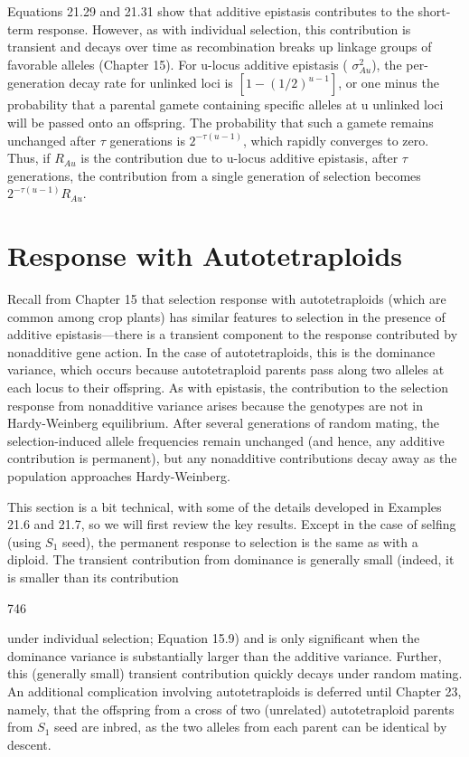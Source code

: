 \documentclass{article}
\begin{document}
Equations 21.29 and 21.31 show that additive epistasis contributes to the short-term response. However, as with individual selection, this contribution is transient and decays over time as recombination breaks up linkage groups of favorable alleles (Chapter 15). For u-locus additive epistasis ( $ \sigma_{Au}^2 $), the per-generation decay rate for unlinked loci is  $ [1 - (1/2)^{u-1}] $, or one minus the probability that a parental gamete containing specific alleles at u unlinked loci will be passed onto an offspring. The probability that such a gamete remains unchanged after  $ \tau $ generations is  $ 2^{-\tau(u-1)} $, which rapidly converges to zero. Thus, if  $ R_{Au} $ is the contribution due to u-locus additive epistasis, after  $ \tau $ generations, the contribution from a single generation of selection becomes  $ 2^{-\tau(u-1)}R_{Au} $.

\section{Response with Autotetraploids}
Recall from Chapter 15 that selection response with autotetraploids (which are common among crop plants) has similar features to selection in the presence of additive epistasis—there is a transient component to the response contributed by nonadditive gene action. In the case of autotetraploids, this is the dominance variance, which occurs because autotetraploid parents pass along two alleles at each locus to their offspring. As with epistasis, the contribution to the selection response from nonadditive variance arises because the genotypes are not in Hardy-Weinberg equilibrium. After several generations of random mating, the selection-induced allele frequencies remain unchanged (and hence, any additive contribution is permanent), but any nonadditive contributions decay away as the population approaches Hardy-Weinberg.

This section is a bit technical, with some of the details developed in Examples 21.6 and 21.7, so we will first review the key results. Except in the case of selfing (using  $ S_{1} $ seed), the permanent response to selection is the same as with a diploid. The transient contribution from dominance is generally small (indeed, it is smaller than its contribution

746

under individual selection; Equation 15.9) and is only significant when the dominance variance is substantially larger than the additive variance. Further, this (generally small) transient contribution quickly decays under random mating. An additional complication involving autotetraploids is deferred until Chapter 23, namely, that the offspring from a cross of two (unrelated) autotetraploid parents from  $ S_{1} $ seed are inbred, as the two alleles from each parent can be identical by descent.
\end{document}
